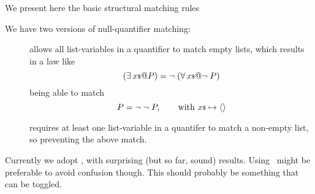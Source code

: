 
We present here the basic structural matching rules

\MRSTRUCT

We have two versions of null-quantifier matching:
\begin{description}
  \item[\MRNullQuantZN] allows all list-variables in a quantifier
   to match empty lists,
   which results in a law like
   \[(\exists \lst x @ P) = \lnot(\forall \lst x @ \lnot P)\]
   being able to match
   \[ P = \neg\;\neg\; P, \qquad \textrm{with } {x}{\scriptstyle\$} \mapsto \langle \rangle \]
  \item[\MRNullQuantON] requires at least one list-variable in a quantifer
   to match a non-empty list, so preventing the above match.
\end{description}
Currently we adopt \MRNullQuantZN, with surprising (but so far, sound) results.
Using \MRNullQuantON\ might be preferable to avoid confusion though.
This should probably be something that can be toggled.
